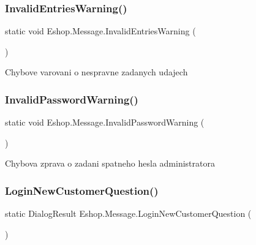 \subsubsection{\texorpdfstring{InvalidEntriesWarning()}{InvalidEntriesWarning()}}
{\footnotesize\ttfamily static void Eshop.\+Message.\+Invalid\+Entries\+Warning (\begin{DoxyParamCaption}{ }\end{DoxyParamCaption})\hspace{0.3cm}{\ttfamily [static]}}



Chybove varovani o nespravne zadanych udajech 

\mbox{\label{class_eshop_1_1_message_ac09dfcff0e3dd57daf5201b4dc067628}} 
\subsubsection{\texorpdfstring{InvalidPasswordWarning()}{InvalidPasswordWarning()}}
{\footnotesize\ttfamily static void Eshop.\+Message.\+Invalid\+Password\+Warning (\begin{DoxyParamCaption}{ }\end{DoxyParamCaption})\hspace{0.3cm}{\ttfamily [static]}}



Chybova zprava o zadani spatneho hesla administratora 

\mbox{\label{class_eshop_1_1_message_a61bf9f2dade0aae2da655784c9527206}} 
\subsubsection{\texorpdfstring{LoginNewCustomerQuestion()}{LoginNewCustomerQuestion()}}
{\footnotesize\ttfamily static Dialog\+Result Eshop.\+Message.\+Login\+New\+Customer\+Question (\begin{DoxyParamCaption}{ }\end{DoxyParamCaption})\hspace{0.3cm}{\ttfamily [static]}}



